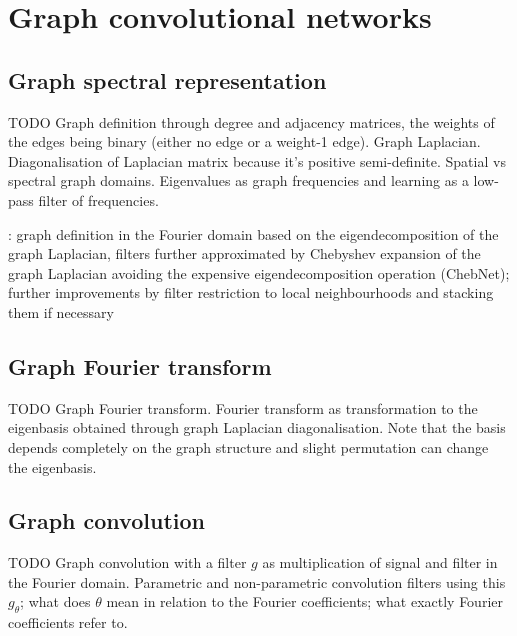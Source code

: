 

\section{Graph convolutional networks}
\label{training-gcn}


\subsection{Graph spectral representation}
TODO Graph definition through degree and adjacency matrices, the weights of the edges being binary (either no edge or a weight-1 edge). Graph Laplacian. Diagonalisation of Laplacian matrix because it's positive semi-definite. Spatial vs spectral graph domains. Eigenvalues as graph frequencies and learning as a low-pass filter of frequencies.

\cite{velickovic2018graph}: graph definition in the Fourier domain based on the eigendecomposition of the graph Laplacian, filters further approximated by Chebyshev expansion of the graph Laplacian avoiding the expensive eigendecomposition operation (ChebNet); further improvements by filter restriction to local neighbourhoods and stacking them if necessary 

\subsection{Graph Fourier transform}
TODO Graph Fourier transform. Fourier transform as transformation to the eigenbasis obtained through graph Laplacian diagonalisation. Note that the basis depends completely on the graph structure and slight permutation can change the eigenbasis.

\subsection{Graph convolution}
TODO Graph convolution with a filter $g$ as multiplication of signal and filter in the Fourier domain. Parametric and non-parametric convolution filters using this $g_\theta$; what does $\theta$ mean in relation to the Fourier coefficients; what exactly Fourier coefficients refer to.

